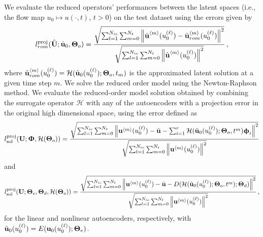 We evaluate the reduced operators' performances between the latent spaces (i.e., the flow map $u_0 \mapsto u(\cdot, t)$, $t > 0$) on the test dataset using the errors given by
\begin{align}
    l^{\text{proj}}_{rom}(\hat{\textbf{U}}; \hat{\textbf{u}}_0, \boldsymbol{\Theta}_o) = \frac{\sqrt{\sum_{l=1}^{N_{ic}}\sum_{m=0}^{N_t}{\left\lVert\hat{\textbf{u}}^{\left<m\right>}(u_0^{(\ell)}) - \hat{\textbf{u}}^{\left<m\right>}_{rom}(u_0^{(\ell)})\right\rVert}^2}}{\sqrt{\sum_{l=1}^{N_{ic}}\sum_{m=0}^{N_t}{\left\lVert\hat{\textbf{u}}^{\left<m\right>}(u_0^{(\ell)})\right\rVert}^2}}\,,
\end{align}
where $\hat{\textbf{u}}^{\left<m\right>}_{rom}(u_0^{(\ell)}) = \mathcal{H}(\hat{\textbf{u}}_0(u_0^{(\ell)}); \boldsymbol{\Theta}_o, t_m)$ is the approximated latent solution at a given time step $m$. We solve the reduced order model using the Newton-Raphson method. We evaluate the reduced-order model solution obtained by combining the surrogate operator $\mathcal{H}$ with any of the autoencoders with a projection error in the original high dimensional space, using the error defined as
\begin{align}
    l^{\text{proj}}_{\text{sol}}(\textbf{U}; \boldsymbol{\Upphi}, \mathcal{H}(\boldsymbol{\Theta}_o)) = \frac{\sqrt{\sum_{l=1}^{N_{ic}}\sum_{m=0}^{N_t}{\left\lVert\textbf{u}^{\left<m\right>}(u_0^{(\ell)}) - \bar{\textbf{u}} - \sum_{i=1}^{r} \mathcal{H}(\hat{\textbf{u}}_0(u_0^{(\ell)}); \boldsymbol{\Theta}_o, t^m)\boldsymbol{\upphi}_i\right\rVert}^2}}{\sqrt{\sum_{l=1}^{N_{ic}}\sum_{m=0}^{N_t}{\left\lVert\textbf{u}^{\left<m\right>}(u_0^{(\ell)})\right\rVert}^2}}
\end{align}
and
\begin{align}
    l^{\text{proj}}_{\text{sol}}(\textbf{U}; \boldsymbol{\Theta}_e, \boldsymbol{\Theta}_d, \mathcal{H}(\boldsymbol{\Theta}_o)) = \frac{\sqrt{\sum_{l=1}^{N_{ic}}\sum_{m=0}^{N_t}{\left\lVert\textbf{u}^{\left<m\right>}(u_0^{(\ell)}) - \bar{\textbf{u}} - D(\mathcal{H}(\hat{\textbf{u}}_0(u_0^{(\ell)}); \boldsymbol{\Theta}_o, t^m); \boldsymbol{\Theta}_d)\right\rVert}^2}}{\sqrt{\sum_{l=1}^{N_{ic}}\sum_{m=0}^{N_t}{\left\lVert\textbf{u}^{\left<m\right>}(u_0^{(\ell)})\right\rVert}^2}}\,,
\end{align}
for the linear and nonlinear autoencoders, respectively, with $\hat{\textbf{u}}_0(u_0^{(\ell)}) = E(\textbf{u}_0(u_0^{(\ell)}); \boldsymbol{\Theta}_e)$.

